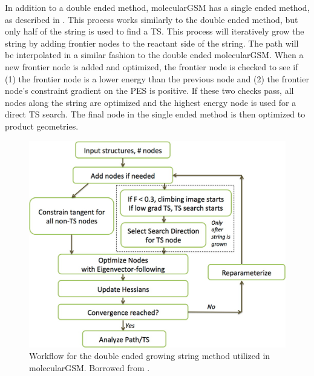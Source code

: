\documentclass[preprint, 11pt]{elsarticle} %
\begin{document}
In addition to a double ended method, molecularGSM has a single ended method, as described in .
This process works similarly to the double ended method, but only half of the string is used to find a TS.
This process will iteratively grow the string by adding frontier nodes to the reactant side of the string. 
The path will be interpolated in a similar fashion to the double ended molecularGSM.
When a new frontier node is added and optimized, the frontier node is checked to see if (1) the frontier node is a lower energy than the previous node and (2) the frontier node's constraint gradient on the PES is positive. 
If these two checks pass, all nodes along the string are optimized and the highest energy node is used for a direct TS search.
The final node in the single ended method is then optimized to product geometries.


\begin{figure}[htbp]
    \centering
    \includegraphics[width=5in]{gsm}
    \caption{Workflow for the double ended growing string method utilized in molecularGSM. Borrowed from \cite{Zimmerman:2013jctc}.}
    \label{fig:gsm}
\end{figure}
\end{document}
